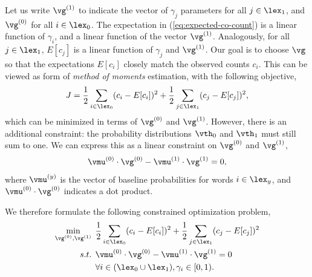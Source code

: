 Let us write $\vg^{(1)}$ to indicate the vector of $\gamma_j$ parameters for all $j \in \lex_1$, and $\vg^{(0)}$ for all $i \in \lex_0$. The expectation in (\ref{eq:expected-co-count}) is a linear function of $\gamma_i$, and a linear function of the vector $\vg^{(1)}$. Analogously, for all $j\in\lex_1$, $E[c_j]$ is a linear function of $\gamma_j$ and $\vg^{(1)}$. Our goal is to choose $\vg$ so that the expectations $E[c_i]$ closely match the observed counts $c_i$. This can be viewed as form of \emph{method of moments} estimation, with the following objective, 
\begin{equation}
J = \frac{1}{2} \sum_{i\in \lex_0}(c_i - E[c_i])^2 + \frac{1}{2}\sum_{j \in \lex_1}(c_j - E[c_j])^2,
\end{equation}
which can be minimized in terms of $\vg^{(0)}$ and $\vg^{(1)}$. However, there is an additional constraint: the probability distributions $\vth_0$ and $\vth_1$ must still sum to one. We can express this as a linear constraint on $\vg^{(0)}$ and $\vg^{(1)}$,
\begin{equation}
\vmu^{(0)} \cdot \vg^{(0)} - \vmu^{(1)} \cdot \vg^{(1)} = 0,
\end{equation}
where $\vmu^{(y)}$ is the vector of baseline probabilities for words $i \in \lex_y$, and $\vmu^{(0)} \cdot \vg^{(0)}$ indicates a dot product. 

We therefore formulate the following constrained optimization problem,
\begin{align}
\notag
\min_{\vg^{(0)}, \vg^{(1)}} & \:\: \frac{1}{2} \sum_{i\in \lex_0}(c_i - E[c_i])^2 + \frac{1}{2}\sum_{j \in \lex_1}(c_j - E[c_j])^2\\
\notag
s.t. &  \:\:  \vmu^{(0)} \cdot \vg^{(0)} - \vmu^{(1)} \cdot \vg^{(1)}=0 \\
& \:\: \forall i \in (\lex_0 \cup \lex_1), \gamma_i \in [0,1).
\label{eq:optimization}
\end{align}

